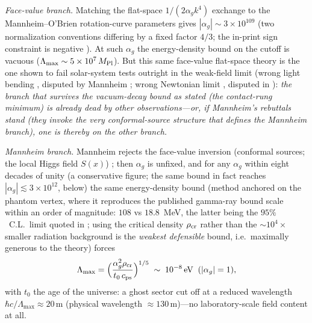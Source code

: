 \documentclass[11pt]{article}
\theoremstyle{definition}
\theoremstyle{remark}
\newcommand{\ag}{\alpha_g}
\begin{document}
\emph{Face-value branch.} Matching the flat-space
$1/(2\ag k^{4})$ exchange to the Mannheim--O'Brien rotation-curve
parameters \cite{MannheimOBrien2011} gives $|\ag|\sim3\times10^{109}$
(two normalization conventions differing by a fixed factor $4/3$; the in-print sign
constraint is negative \cite{Mannheim2015}). At such $\ag$ the
energy-density bound on the cutoff is vacuous
($\Lambda_{\max}\sim5\times10^{7}\,M_{\rm Pl}$). But this same
face-value
flat-space theory is the one shown to fail solar-system tests
outright in the weak-field limit (wrong light bending \cite{Flanagan2006}, disputed by
Mannheim \cite{Mannheim2007}; wrong Newtonian
limit \cite{Yoon2013}, disputed in \cite{Mannheim2015}): \emph{the
branch that survives the vacuum-decay bound as stated (the contact-rung
minimum) is already dead by other observations---or, if Mannheim's
rebuttals stand (they invoke the very conformal-source structure that defines
the Mannheim branch), one is thereby on the other branch.}

\emph{Mannheim branch.} Mannheim rejects the face-value inversion
(conformal sources; the local Higgs field $S(x)$)
\cite{Mannheim2015}; then $\ag$ is unfixed, and for any $\ag$
within eight decades of unity (a conservative figure; the same bound in fact
reaches $|\ag|\lesssim3\times10^{12}$, below) the same energy-density bound
(method anchored on the phantom vertex, where it reproduces the
published gamma-ray bound scale within an order of magnitude:
$108$ vs $18.8$~MeV, the latter being the $95\%$~C.L.\ limit
quoted in \cite{ClinePhantom2024}; using the critical
density $\rho_{\rm cr}$ rather than the ${\sim}10^{4}\times$
smaller radiation background is the \emph{weakest defensible}
bound, i.e.\ maximally generous to the theory) forces
\begin{equation}
\Lambda_{\max}=\Bigl(\frac{\ag^{2}\rho_{\rm cr}}
{t_{0}\,c_{\rm ps}}\Bigr)^{1/5}
\;\sim\;10^{-8}\,\text{eV}\;\;(|\ag|=1),
\end{equation}
with $t_{0}$ the age of the universe:
a ghost sector cut off at a reduced wavelength
$\hbar c/\Lambda_{\max}\approx20\,$m (physical wavelength
${\approx}130\,$m)---no laboratory-scale field content at all.
\end{document}
